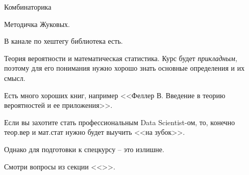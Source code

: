 \documentclass{beamer}
\newcommand{\рис}[1]{рис.\ref{#1}}
\newcommand{\Рис}[1]{Рис.\ref{#1}}
\newcommand{\таблицa}[1]{таблица~№\ref{#1}} %
\newcommand{\таблицы}[1]{таблицы~№\ref{#1}} %
\newcommand{\таблице}[1]{таблице~№\ref{#1}} %
\newcommand{\таблицу}[1]{таблицу~№\ref{#1}} %
\newcommand{\таблицей}[1]{таблицей~№\ref{#1}} %
\newcommand{\Таблицa}[1]{Таблица~№\ref{#1}} %
\newcommand{\Таблицы}[1]{Таблицы~№\ref{#1}} %
\newcommand{\Таблице}[1]{Таблице~№\ref{#1}} %
\newcommand{\Таблицу}[1]{Таблицу~№\ref{#1}} %
\newcommand{\Таблицей}[1]{Таблицей~№\ref{#1}} %
\begin{document}
	\begin{frame}{Комбинаторика}
	
	Методичка Жуковых. 
	
	В канале по хештегу библиотека есть.
	
	\end{frame}

\begin{frame}{Теория вероятности и математическая статистика.}
Курс будет \textit{прикладным}, поэтому для его понимания 
нужно хорошо знать основные определения и их смысл.

Есть много хороших книг, например 
<<Феллер В. Введение в теорию вероятностей и ее приложения>>.

Если вы захотите стать профессиональным Data Scientist-ом,
то, конечно теор.вер и мат.стат нужно будет выучить <<на зубок>>.

Однако для подготовки к спецкурсу -- это излишне.

Смотри вопросы из секции <<>>. 
\end{frame}
   
  
\end{document}
